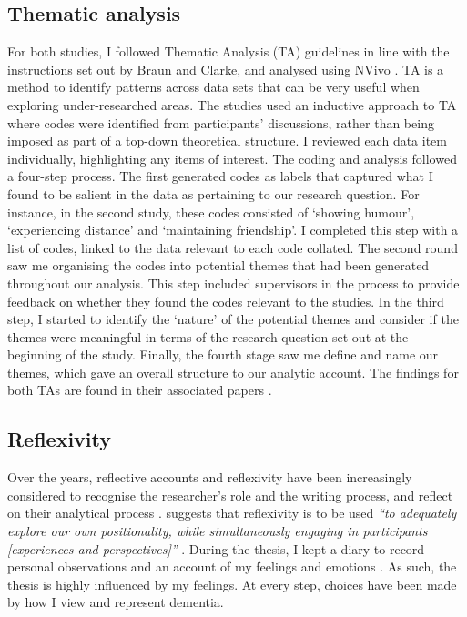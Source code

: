 \subsection{Thematic analysis}
\label{CH4:TA}
For both studies, I followed Thematic Analysis (TA) guidelines in line with the instructions set out by Braun and Clarke, and analysed using NVivo \citep{braun_using_2006,braun_what_2014}. TA is a method to identify patterns across data sets that can be very useful when exploring under-researched areas. The studies used an inductive approach to TA where codes were identified from participants' discussions, rather than being imposed as part of a top-down theoretical structure. I reviewed each data item individually, highlighting any items of interest. The coding and analysis followed a four-step process. The first generated codes as labels that captured what I found to be salient in the data as pertaining to our research question. For instance, in the second study, these codes consisted of `showing humour', `experiencing distance' and `maintaining friendship'. I completed this step with a list of codes, linked to the data relevant to each code collated. The second round saw me organising the codes into potential themes that had been generated throughout our analysis. This step included supervisors in the process to provide feedback on whether they found the codes relevant to the studies. In the third step, I started to identify the `nature' of the potential themes and consider if the themes were meaningful in terms of the research question set out at the beginning of the study. Finally, the fourth stage saw me define and name our themes, which gave an overall structure to our analytic account. The findings for both TAs are found in their associated papers \citep{hodge_exploring_2018,hodge_exploring_2019}.

\subsection{Reflexivity}
\label{CH4:Reflexivity}
Over the years, reflective accounts and reflexivity have been increasingly considered to recognise the researcher's role and the writing process, and reflect on their analytical process \citep{balaam_emotion_2019}. \cite{everett2010lessons} suggests that reflexivity is to be used \textit{``to adequately explore our own positionality, while simultaneously engaging in participants [experiences and perspectives]''} \citep[p. 165]{everett2010lessons}. During the thesis, I kept a diary to record personal observations and an account of my feelings and emotions \citep{glaze2002ph}. As such, the thesis is highly influenced by my feelings. At every step, choices have been made by how I view and represent dementia. 

